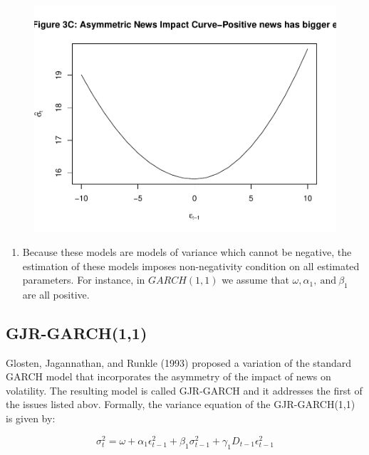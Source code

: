 \documentclass[]{book}
\providecommand{\tightlist}{%
  \setlength{\itemsep}{0pt}\setlength{\parskip}{0pt}}
\theoremstyle{definition}
\theoremstyle{definition}
\theoremstyle{definition}
\theoremstyle{remark}
\begin{document}
\begin{figure}

{\centering \includegraphics[width=1\linewidth]{bookdown-demo_files/figure-latex/ch7-figure2-3} 

}

\end{figure}

\begin{enumerate}
\def\labelenumi{\arabic{enumi}.}
\setcounter{enumi}{1}
\tightlist
\item
  Because these models are models of variance which cannot be negative,
  the estimation of these models imposes non-negativity condition on all
  estimated parameters. For instance, in \(GARCH(1,1)\) we assume that
  \(\omega, \alpha_1, \ \text{and} \ \beta_1\) are all positive.
\end{enumerate}

\hypertarget{gjr-garch11}{%
\subsection{GJR-GARCH(1,1)}\label{gjr-garch11}}

Glosten, Jagannathan, and Runkle (1993) proposed a variation of the
standard GARCH model that incorporates the asymmetry of the impact of
news on volatility. The resulting model is called GJR-GARCH and it
addresses the first of the issues listed abov. Formally, the variance
equation of the GJR-GARCH(1,1) is given by:

\[ \sigma_t^2=\omega+\alpha_1 \epsilon^2_{t-1}+\beta_1 \sigma^2_{t-1}+\gamma_1 D_{t-1}\epsilon^2_{t-1}\]
\end{document}

